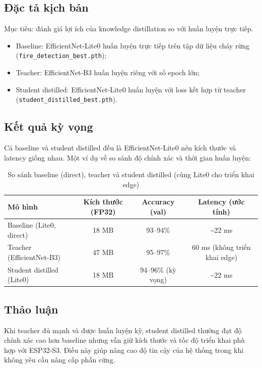 \documentclass[12pt,a4paper]{report}
\begin{document}
\subsection{Đặc tả kịch bản}

Mục tiêu: đánh giá lợi ích của knowledge distillation so với huấn luyện trực tiếp.
\begin{itemize}
  \item Baseline: EfficientNet-Lite0 huấn luyện trực tiếp trên tập dữ liệu cháy rừng (\texttt{fire\_detection\_best.pth});
  \item Teacher: EfficientNet-B3 huấn luyện riêng với số epoch lớn;
  \item Student distilled: EfficientNet-Lite0 huấn luyện với loss kết hợp từ teacher (\texttt{student\_distilled\_best.pth}).
\end{itemize}

\subsection{Kết quả kỳ vọng}

Cả baseline và student distilled đều là EfficientNet-Lite0 nên kích thước và latency giống nhau. Một ví dụ về so sánh độ chính xác và thời gian huấn luyện:
\begin{table}[h]
  \centering
  \caption{So sánh baseline (direct), teacher và student distilled (cùng Lite0 cho triển khai edge)}
  \begin{tabular}{lccc}
    \toprule
    Mô hình & Kích thước (FP32) & Accuracy (val) & Latency (ước tính) \\
    \midrule
    Baseline (Lite0, direct) & 18 MB & 93--94\% & \textasciitilde 22 ms \\
    Teacher (EfficientNet-B3) & 47 MB & 95--97\% & 60 ms (không triển khai edge) \\
    Student distilled (Lite0) & 18 MB & 94--96\% (kỳ vọng) & \textasciitilde 22 ms \\
    \bottomrule
  \end{tabular}
\end{table}

\subsection{Thảo luận}

Khi teacher đủ mạnh và được huấn luyện kỹ, student distilled thường đạt độ chính xác cao hơn baseline nhưng vẫn giữ kích thước và tốc độ triển khai phù hợp với ESP32-S3. Điều này giúp nâng cao độ tin cậy của hệ thống trong khi không yêu cầu nâng cấp phần cứng.
\end{document}
